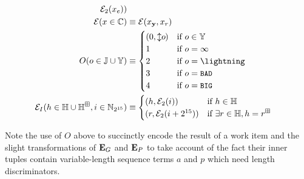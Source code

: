 \begin{align}
    \se_2(x_e)
  ) \\
  \se(x \in \mathbb{C}) &\equiv \se(x_\mathbf{y}, x_r) \\
  O(o \in \mathbb{J} \cup \Y) &\equiv \begin{cases}
    (0, \var{o}) &\when o \in \Y \\
    1 &\when o = \infty \\
    2 &\when o = \panic \\
    3 &\when o = \token{BAD} \\
    4 &\when o = \token{BIG} \\
  \end{cases}\\
  \se_I(h \in \H \cup \H^\boxplus, i \in \N_{2^{15}}) &\equiv \begin{cases}
    (h, \se_2(i)) &\when h \in \H\\
    (r, \se_2(i + 2^{15})) &\when \exists r \in \H, h = r^\boxplus\\
  \end{cases}
\end{align}

Note the use of $O$ above to succinctly encode the result of a work item and the slight transformations of $\mathbf{E}_G$ and $\mathbf{E}_P$ to take account of the fact their inner tuples contain variable-length sequence terms $a$ and $p$ which need length discriminators.
